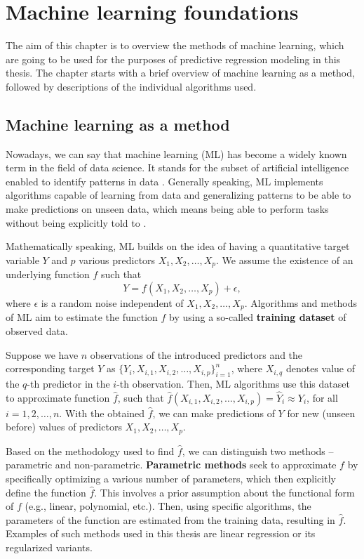 \chapter{Machine learning foundations}
\label{chap:1}
The aim of this chapter is to overview the methods of machine learning, which
are going to be used for the purposes of predictive regression modeling in 
this thesis. The chapter starts with a brief overview of machine learning as
a method, followed by descriptions of the individual algorithms used.

\section{Machine learning as a method}

Nowadays, we can say that machine learning (ML) has become a widely known term in
the field of data science. It stands for the subset of artificial intelligence enabled to identify patterns in data \cite{ibm}.
Generally speaking, ML implements algorithms capable of learning from data and generalizing patterns to be able to make predictions on unseen data,
which means being able to perform tasks without being explicitly told to \cite{islp}.      

Mathematically speaking, ML builds on the idea of having a quantitative target variable $Y$ and $p$ various
predictors $X_1, X_2, \ldots, X_p$. We assume the existence of an underlying function $f$ such that
\begin{equation}
Y = f(X_1, X_2, \ldots, X_p) + \epsilon,
\end{equation}
where $\epsilon$ is a random noise independent of $X_1, X_2, \ldots, X_p$. Algorithms and methods of ML 
aim to estimate the function $f$ by using a so-called \textbf{training dataset} of observed data. 

Suppose we have $n$ observations of the introduced predictors and the corresponding target $Y$ as $\{ Y_i, X_{i, 1}, X_{i, 2}, \ldots, X_{i, p} \}_{i=1}^{n}$, where $X_{i, q}$ denotes value of the $q$-th predictor in the $i$-th observation.
Then, ML algorithms use this dataset to approximate function $\hat{f}$, such that $\hat{f}(X_{i, 1}, X_{i, 2}, \ldots, X_{i, p}) = \hat{Y}_i \approx Y_i$, for all $i=1, 2, \ldots, n$. With the obtained $\hat{f}$, we can make predictions of $Y$ for new (unseen before) values of predictors $X_1, X_2, \ldots, X_p$.
\newline
\par
Based on the methodology used to find $\hat{f}$, we can distinguish two methods – parametric and non-parametric. 
\textbf{Parametric methods} seek to approximate $f$ by specifically optimizing a various number of parameters, which then explicitly define the function $\hat{f}$. This involves a prior assumption
about the functional form of $f$ (e.g., linear, polynomial, etc.). Then, using specific algorithms, the parameters of the function are estimated from the training data, resulting in $\hat{f}$. Examples of
such methods used in this thesis are linear regression or its regularized variants. 

